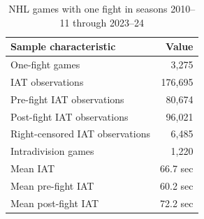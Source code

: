 \begin{table}[htbp]
\centering
\caption{NHL games with one fight in seasons 2010--11 through 2023--24}
\label{tab:one_fight_sample_20102011_20232024}
\scriptsize
\renewcommand{\arraystretch}{1.12}
\setlength{\tabcolsep}{5pt}

\begin{tabular*}{0.78\textwidth}{@{\extracolsep{\fill}}lr}
\toprule
Sample characteristic & Value \\
\midrule
One-fight games & 3,275 \\
IAT observations & 176,695 \\
Pre-fight IAT observations & 80,674 \\
Post-fight IAT observations & 96,021 \\
Right-censored IAT observations & 6,485 \\
Intradivision games & 1,220 \\
Mean IAT & 66.7 sec \\
Mean pre-fight IAT & 60.2 sec \\
Mean post-fight IAT & 72.2 sec \\
\bottomrule
\end{tabular*}
\end{table}
